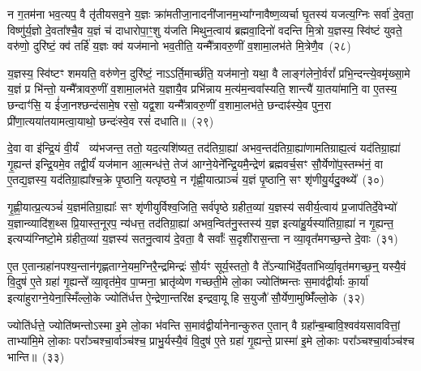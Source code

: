 न ग॒तम॑ना भव॒त्यप॒ वै तृ॑तीय\-सव॒ने य॒ज्ञः क्रा॑मतीजा॒नादनी॑जानम॒भ्या᳚ग्नावैष्ण॒व्यर्चा घृ॒तस्य॑ यजत्य॒ग्निः सर्वा॑ दे॒वता॒ विष्णु॑र्य॒ज्ञो दे॒वता᳚श्चै॒व य॒ज्ञं च॑ दाधारोपा॒ꣳ॒शु य॑जति मिथुन॒त्वाय॑ ब्रह्मवा॒दिनो॑ वदन्ति मि॒त्रो य॒ज्ञस्य॒ स्वि॑ष्टं युवते॒ वरु॑णो॒ दुरि॑ष्टं॒ क्व॑ तर्\mbox{}हि॑ य॒ज्ञः क्व॑ यज॑मानो भव॒तीति॒ यन्मै᳚त्रावरु॒णीं व॒शामा॒लभ॑ते मि॒त्रेणै॒व~(२८)\ip

य॒ज्ञस्य॒ स्वि॑ष्टꣳ शमयति॒ वरु॑णेन॒ दुरि॑ष्टं॒ नाऽऽर्ति॒मार्च्छ॑ति॒ यज॑मानो॒ यथा॒ वै लाङ्ग॑लेनो॒र्वरां᳚ प्रभि॒न्दन्त्ये॒वमृ॑ख्सा॒मे य॒ज्ञं प्र भि॑न्तो॒ यन्मै᳚त्रावरु॒णीं व॒शामा॒लभ॑ते य॒ज्ञायै॒व प्रभि॑न्नाय म॒त्य॑म॒न्ववा᳚स्यति॒ शान्त्यै॑ या॒तया॑मानि॒ वा ए॒तस्य॒ छन्दाꣳ॑सि॒ य ई॑जा॒नश्छन्द॑सामे॒ष रसो॒ यद्व॒शा यन्मै᳚त्रावरु॒णीं व॒शामा॒लभ॑ते॒ छन्दाꣴ॑स्ये॒व पुन॒रा प्री॑णा॒त्यया॑तयामत्वा॒याथो॒ छन्दः॑स्वे॒व रसं॑ दधाति॥~(२९)\ip

{\anuvakamend[{अव॑ दाधार मि॒त्रेणै॒व प्री॑णाति॒ षट्च॑}]}

दे॒वा वा इ॑न्द्रि॒यं वी॒र्यं  व्य॑भजन्त॒ ततो॒ यद॒त्यशि॑ष्यत॒ तद॑तिग्रा॒ह्या॑ अभव॒न्तद॑तिग्रा॒ह्या॑णामतिग्राह्य॒त्वं यद॑तिग्रा॒ह्या॑ गृ॒ह्यन्त॑ इन्द्रि॒यमे॒व तद्वी॒र्यं॑ यज॑मान आ॒त्मन्ध॑त्ते॒ तेज॑ आग्ने॒येने᳚न्द्रि॒यमै॒न्द्रेण॑ ब्रह्मवर्च॒सꣳ सौ॒र्येणो॑प॒स्तम्भ॑नं॒ वा ए॒तद्य॒ज्ञस्य॒ यद॑तिग्रा॒ह्या᳚श्च॒क्रे पृ॒ष्ठानि॒ यत्पृष्ठ्ये॒ न गृ॑ह्णी॒यात्प्राञ्चं॑ य॒ज्ञं पृ॒ष्ठानि॒ सꣳ शृ॑णीयु॒र्यदु॒क्थ्ये᳚~(३०)\ip

गृ॒ह्णी॒यात्प्र॒त्यञ्चं॑ य॒ज्ञम॑तिग्रा॒ह्याः᳚ सꣳ शृ॑णीयुर्विश्व॒जिति॒ सर्व॑पृष्ठे ग्रहीत॒व्या॑ य॒ज्ञस्य॑ सवीर्य॒त्वाय॑ प्र॒जा\-प॑तिर्दे॒वेभ्यो॑ य॒ज्ञान्व्यादि॑श॒थ्स प्रि॒यास्त॒नूरप॒ न्य॑धत्त॒ तद॑तिग्रा॒ह्या॑ अभव॒न्वित॑नु॒स्तस्य॑ य॒ज्ञ इत्या॑हु॒र्यस्या॑तिग्रा॒ह्या॑ न गृ॒ह्यन्त॒ इत्यप्य॑ग्निष्टो॒मे ग्र॑हीत॒व्या॑ य॒ज्ञस्य॑ सतनु॒त्वाय॑ दे॒वता॒ वै सर्वाः᳚ स॒दृशी॑रास॒न्ता न व्या॒वृत᳚मगच्छ॒न्ते दे॒वाः~(३१)\ip

ए॒त ए॒तान्ग्रहा॑नपश्य॒न्तान॑गृह्णताग्ने॒यम॒ग्निरै॒न्द्रमिन्द्रः॑ सौ॒र्यꣳ सूर्य॒स्ततो॒ वै ते᳚\-ऽन्याभि॑र्दे॒वता॑भिर्व्या॒वृत॑मगच्छ॒न्॒ यस्यै॒वं वि॒दुष॑ ए॒ते ग्रहा॑ गृ॒ह्यन्ते᳚ व्या॒वृत॑मे॒व पा॒प्मना॒ भ्रातृ॑व्येण गच्छती॒मे लो॒का ज्योति॑ष्मन्तः स॒माव॑द्वीर्याः का॒र्या॑ इत्या॑हुराग्ने॒येना॒स्मिँल्लो॒के ज्योति॑र्धत्त ऐ॒न्द्रेणा॒न्तरि॑क्ष इन्द्रवा॒यू हि स॒युजौ॑ सौ॒र्येणा॒मुष्मिँ॑ल्लो॒के~(३२)\ip

ज्योति॑र्धत्ते॒ ज्योति॑ष्मन्तो\-ऽस्मा इ॒मे लो॒का भ॑वन्ति स॒माव॑द्वीर्यानेनान्कुरुत ए॒तान् वै ग्रहा᳚न्ब॒म्बावि॒श्वव॑यसाववित्तां॒ ताभ्या॑मि॒मे लो॒काः परा᳚ञ्चश्चा॒र्वाञ्च॑श्च॒ प्राभु॒र्यस्यै॒वं वि॒दुष॑ ए॒ते ग्रहा॑ गृ॒ह्यन्ते॒ प्रास्मा॑ इ॒मे लो॒काः परा᳚ञ्चश्चा॒र्वाञ्च॑श्च भान्ति॥~(३३)\ip

